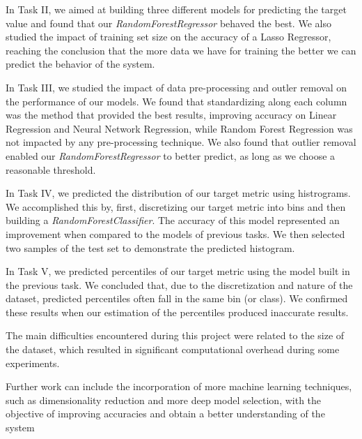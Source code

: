 \documentclass[10pt]{article}
\begin{document}
In Task II, we aimed at building three different models for predicting the target value and found that our \textit{RandomForestRegressor} behaved the best. We also studied the impact of training set size on the accuracy of a Lasso Regressor, reaching the conclusion that the more data we have for training the better we can predict the behavior of the system.

In Task III, we studied the impact of data pre-processing and outler removal on the performance of our models. We found that standardizing along each column was the method that provided the best results, improving accuracy on Linear Regression and Neural Network Regression, while Random Forest Regression was not impacted by any pre-processing technique. We also found that outlier removal enabled our \textit{RandomForestRegressor} to better predict, as long as we choose a reasonable threshold.

In Task IV, we predicted the distribution of our target metric using histrograms. We accomplished this by, first, discretizing our target metric into bins and then building a \textit{RandomForestClassifier}. The accuracy of this model represented an improvement when compared to the models of previous tasks. We then selected two samples of the test set to demonstrate the predicted histogram.

In Task V, we predicted percentiles of our target metric using the model built in the previous task. We concluded that, due to the discretization and nature of the dataset, predicted percentiles often fall in the same bin (or class). We confirmed these results when our estimation of the percentiles produced inaccurate results.

The main difficulties encountered during this project were related to the size of the dataset, which resulted in significant computational overhead during some experiments.

Further work can include the incorporation of more machine learning techniques, such as dimensionality reduction and more deep model selection, with the objective of improving accuracies and obtain a better understanding of the system

\printbibliography
\end{document}

